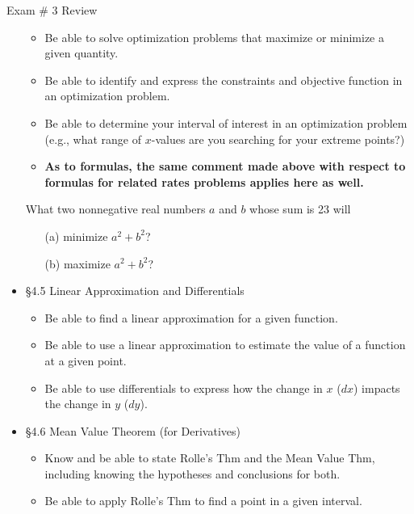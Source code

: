 \documentclass[cal1spr16Lectures.tex]{subfiles}
\begin{document}
\begin{frame}[allowframebreaks]{Exam \# 3 Review}
\begin{itemize}
	\begin{itemize}\footnotesize
	\item Be able to solve optimization problems that maximize or minimize a given quantity.
	\item Be able to identify and express the constraints and objective function in an optimization problem.
	\item Be able to determine your interval of interest in an optimization problem (e.g., what range of $x$-values are you searching for your extreme points?)
	\item {\bf As to formulas, the same comment made above with respect to formulas for related rates problems applies here as well.}
	\end{itemize}
\begin{exe} What two nonnegative real numbers $a$ and $b$ whose sum is 23 will 
		\begin{itemize}
		\item[(a)] minimize $a^2+b^2$?
		\item[(b)] maximize $a^2+b^2$?
		\end{itemize}	
\end{exe}
\item \S 4.5 Linear Approximation and Differentials
	\begin{itemize}\footnotesize
	\item Be able to find a linear approximation for a given function.
	\item Be able to use a linear approximation to estimate the value of a function at a given point.
	\item Be able to use differentials to express how the change in $x$ ($dx$) impacts the change in $y$ ($dy$).
	\end{itemize}
\item \S 4.6 Mean Value Theorem (for Derivatives)
	\begin{itemize}\footnotesize
	\item Know and be able to state Rolle's Thm and the Mean Value Thm, including knowing the hypotheses and conclusions for both.
	\item Be able to apply Rolle's Thm to find a point in a given interval.

\end{itemize}
\end{itemize}
\end{frame}
\end{document}

